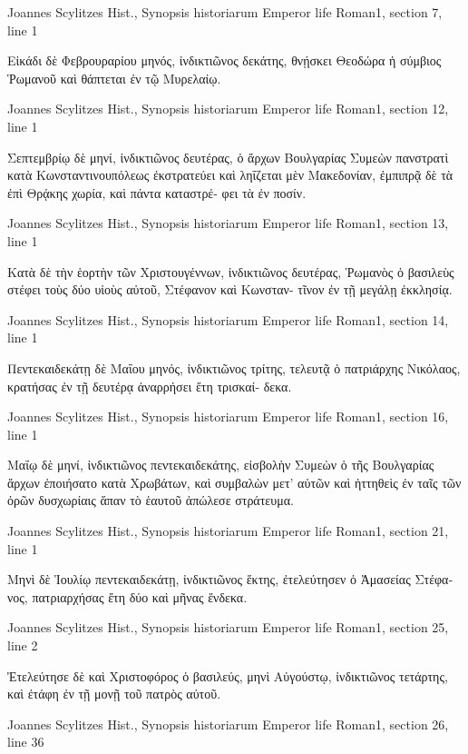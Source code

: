 \documentclass[12pt,letterpaper,twoside,final]{memoir}
\begin{document}
\begin{greek}
Joannes Scylitzes Hist., Synopsis historiarum 
Emperor life Roman1, section 7, line 1

Εἰκάδι δὲ Φεβρουραρίου μηνός, ἰνδικτιῶνος δεκάτης, θνῄσκει 
Θεοδώρα ἡ σύμβιος Ῥωμανοῦ καὶ θάπτεται ἐν τῷ Μυρελαίῳ. 



Joannes Scylitzes Hist., Synopsis historiarum 
Emperor life Roman1, section 12, line 1

Σεπτεμβρίῳ δὲ μηνί, ἰνδικτιῶνος δευτέρας, ὁ ἄρχων Βουλγαρίας 
Συμεὼν πανστρατὶ κατὰ Κωνσταντινουπόλεως ἐκστρατεύει καὶ ληΐζεται 
μὲν Μακεδονίαν, ἐμπιπρᾷ δὲ τὰ ἐπὶ Θρᾴκης χωρία, καὶ πάντα καταστρέ-  
φει τὰ ἐν ποσίν. 



Joannes Scylitzes Hist., Synopsis historiarum 
Emperor life Roman1, section 13, line 1

Κατὰ δὲ τὴν ἑορτὴν τῶν Χριστουγέννων, ἰνδικτιῶνος δευτέρας, 
Ῥωμανὸς ὁ βασιλεὺς στέφει τοὺς δύο υἱοὺς αὐτοῦ, Στέφανον καὶ Κωνσταν-
τῖνον ἐν τῇ μεγάλῃ ἐκκλησίᾳ. 



Joannes Scylitzes Hist., Synopsis historiarum 
Emperor life Roman1, section 14, line 1

Πεντεκαιδεκάτῃ δὲ Μαΐου μηνός, ἰνδικτιῶνος τρίτης, τελευτᾷ 
ὁ πατριάρχης Νικόλαος, κρατήσας ἐν τῇ δευτέρᾳ ἀναρρήσει ἔτη τρισκαί-
δεκα. 



Joannes Scylitzes Hist., Synopsis historiarum 
Emperor life Roman1, section 16, line 1

Μαΐῳ δὲ μηνί, ἰνδικτιῶνος πεντεκαιδεκάτης, εἰσβολὴν Συμεὼν ὁ 
τῆς Βουλγαρίας ἄρχων ἐποιήσατο κατὰ Χρωβάτων, καὶ συμβαλὼν μετ' 
αὐτῶν καὶ ἡττηθεὶς ἐν ταῖς τῶν ὀρῶν δυσχωρίαις ἅπαν τὸ ἑαυτοῦ 
ἀπώλεσε στράτευμα. 



Joannes Scylitzes Hist., Synopsis historiarum 
Emperor life Roman1, section 21, line 1

Μηνὶ δὲ Ἰουλίῳ πεντεκαιδεκάτῃ, ἰνδικτιῶνος ἕκτης, ἐτελεύτησεν 
ὁ Ἀμασείας Στέφανος, πατριαρχήσας ἔτη δύο καὶ μῆνας ἕνδεκα. 



Joannes Scylitzes Hist., Synopsis historiarum 
Emperor life Roman1, section 25, line 2

Ἐτελεύτησε δὲ καὶ Χριστοφόρος ὁ βασιλεύς, μηνὶ Αὐγούστῳ, 
ἰνδικτιῶνος τετάρτης, καὶ ἐτάφη ἐν τῇ μονῇ τοῦ πατρὸς αὐτοῦ. 



Joannes Scylitzes Hist., Synopsis historiarum 
Emperor life Roman1, section 26, line 36


\end{greek}
\end{document}
